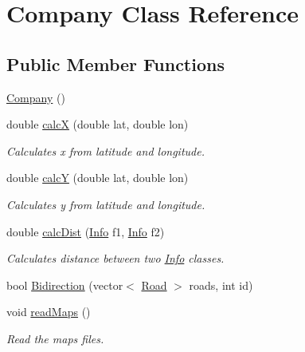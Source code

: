 \hypertarget{class_company}{}\section{Company Class Reference}
\label{class_company}
\subsection*{Public Member Functions}
\begin{DoxyCompactItemize}
\item 
\hyperlink{class_company_a29937dda711b09df306ae7ca9b3d6b42}{Company} ()
\item 
double \hyperlink{class_company_abd0b1a606cefd9264ef3d88933298bcf}{calcX} (double lat, double lon)
\begin{DoxyCompactList}\small\item\em Calculates x from latitude and longitude. \end{DoxyCompactList}\item 
double \hyperlink{class_company_a304161b9fc41ffbfd4ee5b611bc0970d}{calcY} (double lat, double lon)
\begin{DoxyCompactList}\small\item\em Calculates y from latitude and longitude. \end{DoxyCompactList}\item 
double \hyperlink{class_company_a71a2abfa49e7940f50e09659ec5ad45e}{calc\+Dist} (\hyperlink{class_info}{Info} f1, \hyperlink{class_info}{Info} f2)
\begin{DoxyCompactList}\small\item\em Calculates distance between two \hyperlink{class_info}{Info} classes. \end{DoxyCompactList}\item 
bool \hyperlink{class_company_aa76aa2736a1deb9a8679804b79de6d73}{Bidirection} (vector$<$ \hyperlink{class_road}{Road} $>$ roads, int id)
\item 
\mbox{\label{class_company_a73d4e9b6527ae0b1382058a3bbe72a28}} 
void \hyperlink{class_company_a73d4e9b6527ae0b1382058a3bbe72a28}{read\+Maps} ()
\begin{DoxyCompactList}\small\item\em Read the maps files. \end{DoxyCompactList}\item 
\mbox{\label{class_company_a3354d9b8df72709b55edeaf14af14530}} 

\end{DoxyCompactItemize}
